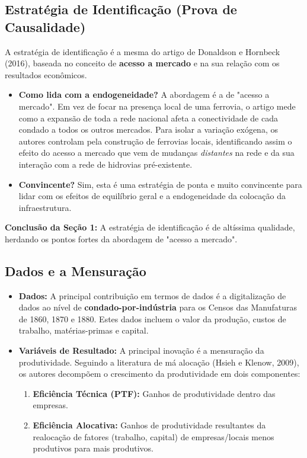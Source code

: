 \documentclass[12pt, a4paper]{article}
\begin{document}
\subsection{Estratégia de Identificação (Prova de Causalidade)}
A estratégia de identificação é a mesma do artigo de Donaldson e Hornbeck (2016), baseada no conceito de \textbf{acesso a mercado} e na sua relação com os resultados econômicos.

\begin{itemize}
    \item \textbf{Como lida com a endogeneidade?} A abordagem é a de "acesso a mercado". Em vez de focar na presença local de uma ferrovia, o artigo mede como a expansão de toda a rede nacional afeta a conectividade de cada condado a todos os outros mercados. Para isolar a variação exógena, os autores controlam pela construção de ferrovias locais, identificando assim o efeito do acesso a mercado que vem de mudanças \textit{distantes} na rede e da sua interação com a rede de hidrovias pré-existente.
    \item \textbf{Convincente?} Sim, esta é uma estratégia de ponta e muito convincente para lidar com os efeitos de equilíbrio geral e a endogeneidade da colocação da infraestrutura.
\end{itemize}

\noindent\textbf{Conclusão da Seção 1:} A estratégia de identificação é de altíssima qualidade, herdando os pontos fortes da abordagem de "acesso a mercado".

\subsection{Dados e a Mensuração}

\begin{itemize}
    \item \textbf{Dados:} A principal contribuição em termos de dados é a digitalização de dados ao nível de \textbf{condado-por-indústria} para os Censos das Manufaturas de 1860, 1870 e 1880. Estes dados incluem o valor da produção, custos de trabalho, matérias-primas e capital.
    \item \textbf{Variáveis de Resultado:} A principal inovação é a mensuração da produtividade. Seguindo a literatura de má alocação (Hsieh e Klenow, 2009), os autores decompõem o crescimento da produtividade em dois componentes:
        \begin{enumerate}
            \item \textbf{Eficiência Técnica (PTF):} Ganhos de produtividade dentro das empresas.
            \item \textbf{Eficiência Alocativa:} Ganhos de produtividade resultantes da realocação de fatores (trabalho, capital) de empresas/locais menos produtivos para mais produtivos.
        \end{enumerate}
\end{itemize}
\end{document}
